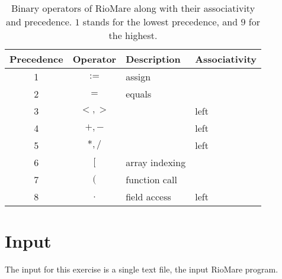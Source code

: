 \documentclass{article}
\begin{document}
\begin{table}[h]
\centering
\begin{tabular}{ |c|c|l|l| }
\hline
Precedence & Operator & Description & Associativity \\
\hline
\hline
1          & $:=$            & assign         &       \\
\hline
2          & $=$             & equals         &       \\
\hline
3          & $<,>$           &                & left  \\
\hline
4          & $+,-$           &                & left  \\
\hline
5          & $*,/$           &                & left  \\
\hline
6          & $[$             & array indexing &       \\
\hline
7          & $($             & function call  &       \\
\hline
8          & $.$     & field access   & left  \\
\hline
\end{tabular}
\caption{
Binary operators of RioMare along with their associativity and precedence.
$1$ stands for the lowest precedence, and $9$ for the highest.
\label{Table_Binary_Operators_Of_RioMare}}
\end{table}
\section{Input}
The input for this exercise is a single text file, the input RioMare program.
\end{document}
